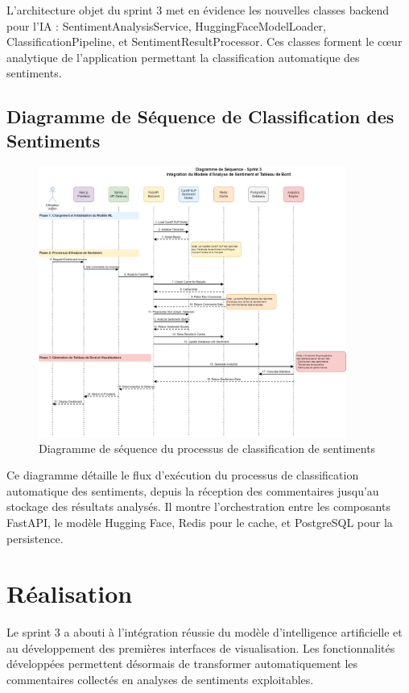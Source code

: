 L'architecture objet du sprint 3 met en évidence les nouvelles classes backend pour l'IA : SentimentAnalysisService, HuggingFaceModelLoader, ClassificationPipeline, et SentimentResultProcessor. Ces classes forment le cœur analytique de l'application permettant la classification automatique des sentiments.

\subsection{Diagramme de Séquence de Classification des Sentiments}

\begin{figure}[H]
\centering
\includegraphics[width=0.9\textwidth]{assets/images/sprint3-sequence.png}
\caption{Diagramme de séquence du processus de classification de sentiments}
\label{fig:sentiment-sequence}
\end{figure}

Ce diagramme détaille le flux d'exécution du processus de classification automatique des sentiments, depuis la réception des commentaires jusqu'au stockage des résultats analysés. Il montre l'orchestration entre les composants FastAPI, le modèle Hugging Face, Redis pour le cache, et PostgreSQL pour la persistence.

\section{Réalisation}

Le sprint 3 a abouti à l'intégration réussie du modèle d'intelligence artificielle et au développement des premières interfaces de visualisation. Les fonctionnalités développées permettent désormais de transformer automatiquement les commentaires collectés en analyses de sentiments exploitables.

